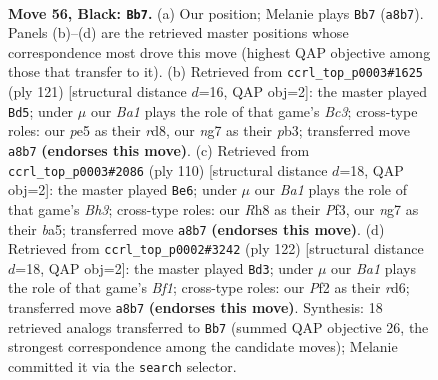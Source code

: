 \documentclass[11pt]{article}
\begin{document}
\clearpage

\begin{figure}[p]\centering
\begin{subfigure}{0.46\textwidth}\centering
\resizebox{\linewidth}{!}{%
\newchessgame
\chessboard[
  setfen={b6r/P4KN1/2k5/4P3/8/8/5p2/8 b - - 0 56},
  showmover=false,
  pgfstyle=straightmove, color=movearrow, markmove={a8-b7}
]}
\caption{}
\end{subfigure}\hfill
\begin{subfigure}{0.46\textwidth}\centering
\resizebox{\linewidth}{!}{%
\newchessgame
\chessboard[
  setfen={3R4/8/2b5/8/4k3/PP6/6r1/2K5 b - - 6 61},
  showmover=false,
  pgfstyle=straightmove, color=movearrow, markmove={c6-d5}
]}
\caption{}
\end{subfigure}
\\[4pt]
\begin{subfigure}{0.46\textwidth}\centering
\resizebox{\linewidth}{!}{%
\newchessgame
\chessboard[
  setfen={8/7k/5p2/b7/7p/5P1B/8/5K2 w - - 4 56},
  showmover=false,
  pgfstyle=straightmove, color=movearrow, markmove={h3-e6}
]}
\caption{}
\end{subfigure}\hfill
\begin{subfigure}{0.46\textwidth}\centering
\resizebox{\linewidth}{!}{%
\newchessgame
\chessboard[
  setfen={8/8/3r4/3k4/1p1n4/4R3/1P4K1/5B2 w - - 7 62},
  showmover=false,
  pgfstyle=straightmove, color=movearrow, markmove={f1-d3}
]}
\caption{}
\end{subfigure}
\caption{\textbf{Move 56, Black: \texttt{Bb7}.} (a) Our position; Melanie plays \texttt{Bb7} (\texttt{a8b7}). Panels (b)--(d) are the retrieved master positions whose correspondence most drove this move (highest QAP objective among those that transfer to it). (b) Retrieved from \texttt{ccrl\_top\_p0003\#1625} (ply 121) [structural distance $d$=16, QAP obj=2]: the master played \texttt{Bd5}; under $\mu$ our \emph{Ba1} plays the role of that game's \emph{Bc3}; cross-type roles: our \emph{p}e5 as their \emph{r}d8, our \emph{n}g7 as their \emph{p}b3; transferred move \texttt{a8b7} \textbf{(endorses this move)}. (c) Retrieved from \texttt{ccrl\_top\_p0003\#2086} (ply 110) [structural distance $d$=18, QAP obj=2]: the master played \texttt{Be6}; under $\mu$ our \emph{Ba1} plays the role of that game's \emph{Bh3}; cross-type roles: our \emph{R}h8 as their \emph{P}f3, our \emph{n}g7 as their \emph{b}a5; transferred move \texttt{a8b7} \textbf{(endorses this move)}. (d) Retrieved from \texttt{ccrl\_top\_p0002\#3242} (ply 122) [structural distance $d$=18, QAP obj=2]: the master played \texttt{Bd3}; under $\mu$ our \emph{Ba1} plays the role of that game's \emph{Bf1}; cross-type roles: our \emph{P}f2 as their \emph{r}d6; transferred move \texttt{a8b7} \textbf{(endorses this move)}. Synthesis: 18 retrieved analogs transferred to \texttt{Bb7} (summed QAP objective 26, the strongest correspondence among the candidate moves); Melanie committed it via the \texttt{search} selector.}
\label{fig:thought-m111}
\end{figure}
\end{document}
